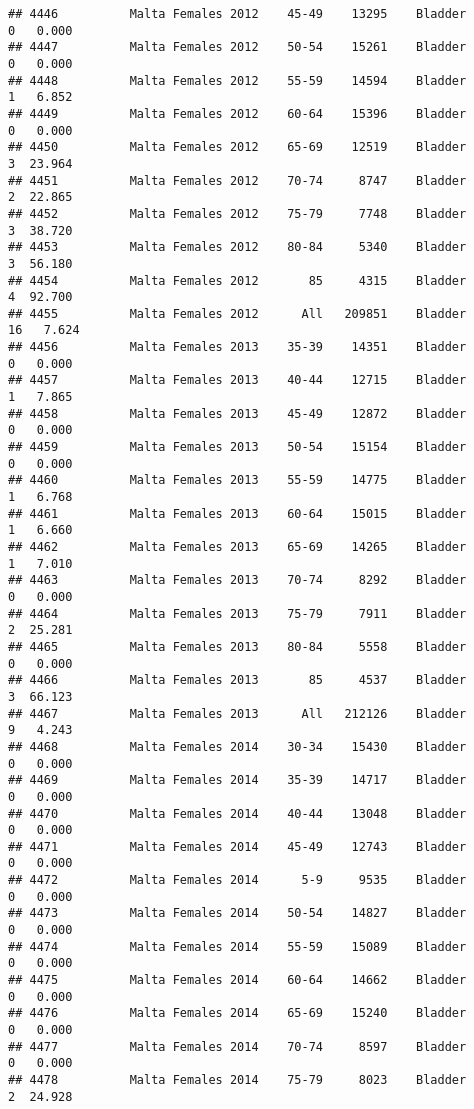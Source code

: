 \documentclass[
]{article}
\begin{document}
\begin{verbatim}
## 4446          Malta Females 2012    45-49    13295    Bladder      0   0.000
## 4447          Malta Females 2012    50-54    15261    Bladder      0   0.000
## 4448          Malta Females 2012    55-59    14594    Bladder      1   6.852
## 4449          Malta Females 2012    60-64    15396    Bladder      0   0.000
## 4450          Malta Females 2012    65-69    12519    Bladder      3  23.964
## 4451          Malta Females 2012    70-74     8747    Bladder      2  22.865
## 4452          Malta Females 2012    75-79     7748    Bladder      3  38.720
## 4453          Malta Females 2012    80-84     5340    Bladder      3  56.180
## 4454          Malta Females 2012       85     4315    Bladder      4  92.700
## 4455          Malta Females 2012      All   209851    Bladder     16   7.624
## 4456          Malta Females 2013    35-39    14351    Bladder      0   0.000
## 4457          Malta Females 2013    40-44    12715    Bladder      1   7.865
## 4458          Malta Females 2013    45-49    12872    Bladder      0   0.000
## 4459          Malta Females 2013    50-54    15154    Bladder      0   0.000
## 4460          Malta Females 2013    55-59    14775    Bladder      1   6.768
## 4461          Malta Females 2013    60-64    15015    Bladder      1   6.660
## 4462          Malta Females 2013    65-69    14265    Bladder      1   7.010
## 4463          Malta Females 2013    70-74     8292    Bladder      0   0.000
## 4464          Malta Females 2013    75-79     7911    Bladder      2  25.281
## 4465          Malta Females 2013    80-84     5558    Bladder      0   0.000
## 4466          Malta Females 2013       85     4537    Bladder      3  66.123
## 4467          Malta Females 2013      All   212126    Bladder      9   4.243
## 4468          Malta Females 2014    30-34    15430    Bladder      0   0.000
## 4469          Malta Females 2014    35-39    14717    Bladder      0   0.000
## 4470          Malta Females 2014    40-44    13048    Bladder      0   0.000
## 4471          Malta Females 2014    45-49    12743    Bladder      0   0.000
## 4472          Malta Females 2014      5-9     9535    Bladder      0   0.000
## 4473          Malta Females 2014    50-54    14827    Bladder      0   0.000
## 4474          Malta Females 2014    55-59    15089    Bladder      0   0.000
## 4475          Malta Females 2014    60-64    14662    Bladder      0   0.000
## 4476          Malta Females 2014    65-69    15240    Bladder      0   0.000
## 4477          Malta Females 2014    70-74     8597    Bladder      0   0.000
## 4478          Malta Females 2014    75-79     8023    Bladder      2  24.928

\end{verbatim}
\end{document}
